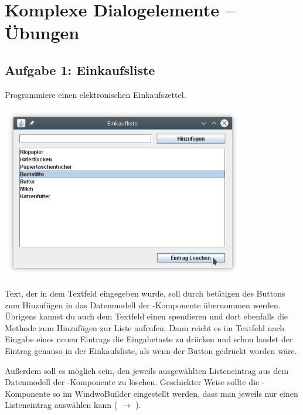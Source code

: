 \clearpage

\rehead[]{\textcolor{lightblue}{AvHG, Inf, My}}
\lohead[]{\textcolor{lightblue}{AvHG, Inf, My}}

\section{Komplexe Dialogelemente -- Übungen}

\subsection{Aufgabe 1: Einkaufsliste}

Programmiere einen elektronischen Einkaufszettel.

\begin{center}
\includegraphics[width=0.8\textwidth]{./inf/SEKII/24_Java_GUI-Komponenten/Einkaufsliste.png}
\end{center}

Text, der in dem Textfeld eingegeben wurde, soll durch betätigen des Buttons zum
Hinzufügen in das Datenmodell der -Komponente übernommen werden.
Übrigens kannst du auch dem Textfeld einen  spendieren
und dort ebenfalls die Methode zum Hinzufügen zur Liste aufrufen. Dann reicht es
im Textfeld nach Eingabe eines neuen Eintrags die Eingabetaste zu drücken und
schon landet der Eintrag genauso in der Einkaufsliste, als wenn der Button
gedrückt worden wäre.

Außerdem soll es möglich sein, den jeweils ausgewählten Listeneintrag aus dem
Datenmodell der -Komponente zu löschen. Geschickter Weise sollte
die -Komponente so im WindwoBuilder eingestellt werden, dass man
jeweils nur einen Listeneintrag auswählen kann (
$\rightarrow$ ).
